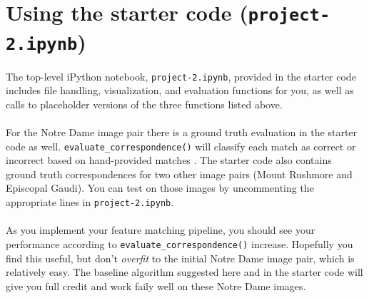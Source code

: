 \documentclass{article}
\begin{document}
\section*{Using the starter code (\lstinline{project-2.ipynb})}
The top-level iPython notebook, \lstinline{project-2.ipynb}, provided in the starter code includes file handling, visualization, and evaluation functions for you, as well as calls to placeholder versions of the three functions listed above.
\\
\\
For the Notre Dame image pair there is a ground truth evaluation in the starter code as well. \lstinline{evaluate_}\lstinline{correspondence()} will classify each match as correct or incorrect based on hand-provided matches . The starter code also contains ground truth correspondences for two other image pairs (Mount Rushmore and Episcopal Gaudi). You can test on those images by uncommenting the appropriate lines in \lstinline{project-2.ipynb}. %
\\
\\
As you implement your feature matching pipeline, you should see your performance according to \lstinline{evaluate_}\lstinline{correspondence()} increase. Hopefully you find this useful, but don't \textit{overfit} to the initial Notre Dame image pair, which is relatively easy. The baseline algorithm suggested here and in the starter code will give you full credit and work faily well on these Notre Dame images. %
\end{document}
